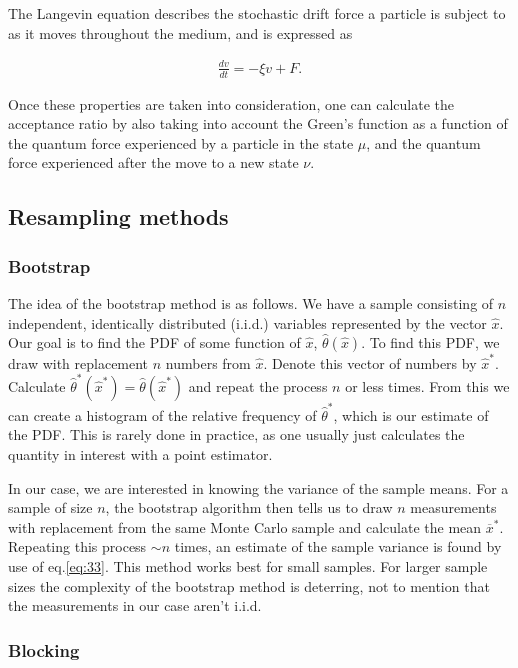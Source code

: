 \documentclass[
    a4paper, aps, twocolumn, floatfix, superscriptaddress,
    nofootinbib]{revtex4-1}
\begin{document}
The Langevin equation describes the stochastic drift force a particle is subject to as it moves throughout the medium, and is expressed as

\begin{align}
    \frac{dv}{dt} = -\xi v + F. \label{eq:Langevin}
\end{align}

Once these properties are taken into consideration, one can calculate the acceptance ratio by also taking into account the Green's function as a function of the quantum force experienced by a particle in the state $\mu$, and the quantum force experienced after the move to a new state $\nu$.

\subsection{Resampling methods}
\subsubsection{Bootstrap}\label{subsubsec:bootstrap}
The idea of the bootstrap method is as follows. We have a sample consisting of $n$ independent, identically distributed (i.i.d.) variables represented by the vector $\hat{x}$. Our goal is to find the PDF of some function of $\hat{x}$,  $\hat{\theta}(\hat{x})$. To find this PDF, we draw with replacement $n$ numbers from $\hat{x}$. Denote this vector of numbers by $\hat{x}^{\ast}$. Calculate $\hat\theta^{\ast}(\hat{x}^{\ast}) =\hat\theta(\hat{x}^{\ast})$ and repeat the process $n$ or less times. From this we can create a histogram of the relative frequency of $\hat\theta^{\ast}$, which is our estimate of the PDF. This is rarely done in practice, as one usually just calculates the quantity in interest with a point estimator.

In our case, we are interested in knowing the variance of the sample means. For a sample of size $n$, the bootstrap algorithm then tells us to draw  $n$ measurements with replacement from the same Monte Carlo sample and calculate the mean $\overline{x}^{\ast}$. Repeating this process $\sim n$ times, an estimate of the sample variance is found by use of eq.\eqref{eq:33}. This method works best for small samples. For larger sample sizes the complexity of the bootstrap method is deterring, not to mention that the measurements in our case aren't i.i.d.
\subsubsection{Blocking}\label{subsubsec:blocking}
\end{document}
